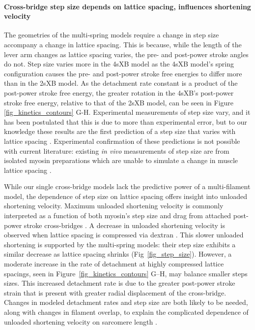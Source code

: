 \documentclass[10pt]{article}
\newcommand{\citep}[1]{\cite{#1}} %
\begin{document}
\paragraph{Cross-bridge step size depends on lattice spacing, influences shortening velocity} %
The geometries of the multi-spring models require a change in step size accompany a change in lattice spacing. 
This is because, while the length of the lever arm changes as lattice spacing varies, the pre- and post-power stroke angles do not. 
Step size varies more in the 4sXB model as the 4sXB model's spring configuration causes the pre- and post-power stroke free energies to differ more than in the 2sXB model. 
As the detachment rate constant is a product of the post-power stroke free energy, the greater rotation in the 4sXB's post-power stroke free energy, relative to that of the 2sXB model, can be seen in Figure \ref{fig_kinetics_contours} G-H. 
Experimental measurements of step size vary, and it has been postulated that this is due to more than experimental error, but to our knowledge these results are the first prediction of a step size that varies with lattice spacing \citep{Brenner2006}.
Experimental confirmation of these predictions is not possible with current literature: existing \textit{in vivo} measurements of step size are from isolated myosin preparations which are unable to simulate a change in muscle lattice spacing \citep{HowardBook, Peterman2004}. 

While our single cross-bridge models lack the predictive power of a multi-filament model, the dependence of step size on lattice spacing offers insight into unloaded shortening velocity. 
Maximum unloaded shortening velocity is commonly interpreted as a function of both myosin's step size and drag from attached post-power stroke cross-bridges \citep{Gordon2000}. 
A decrease in unloaded shortening velocity is observed when lattice spacing is compressed via dextran \citep{Goldman1987, Metzger1987}. 
This slower unloaded shortening is supported by the multi-spring models: their step size exhibits a similar decrease as lattice spacing shrinks (Fig~\ref{fig_step_size}). 
However, a moderate increase in the rate of detachment at highly compressed lattice spacings, seen in Figure~\ref{fig_kinetics_contours} G--H, may balance smaller steps sizes. 
This increased detachment rate is due to the greater post-power stroke strain that is present with greater radial displacement of the cross-bridge. 
Changes in modeled detachment rates and step size are both likely to be needed, along with changes in filament overlap, to explain the complicated dependence of unloaded shortening velocity on sarcomere length \citep{Edman1979}. 
\end{document}
